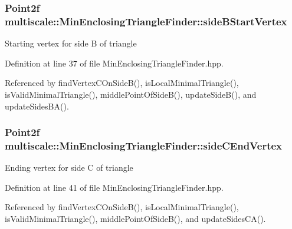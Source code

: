 \hypertarget{classmultiscale_1_1MinEnclosingTriangleFinder_a5f6c0f9361e4aab168f068f08b700742}{
\subsubsection[{side\-B\-Start\-Vertex}]{\setlength{\rightskip}{0pt plus 5cm}Point2f multiscale\-::\-Min\-Enclosing\-Triangle\-Finder\-::side\-B\-Start\-Vertex\hspace{0.3cm}{\ttfamily [private]}}}\label{classmultiscale_1_1MinEnclosingTriangleFinder_a5f6c0f9361e4aab168f068f08b700742}
Starting vertex for side B of triangle 

Definition at line 37 of file Min\-Enclosing\-Triangle\-Finder.\-hpp.



Referenced by find\-Vertex\-C\-On\-Side\-B(), is\-Local\-Minimal\-Triangle(), is\-Valid\-Minimal\-Triangle(), middle\-Point\-Of\-Side\-B(), update\-Side\-B(), and update\-Sides\-B\-A().

\hypertarget{classmultiscale_1_1MinEnclosingTriangleFinder_a3f0f5bbef4e89caed8d153f1fc2eccea}{
\subsubsection[{side\-C\-End\-Vertex}]{\setlength{\rightskip}{0pt plus 5cm}Point2f multiscale\-::\-Min\-Enclosing\-Triangle\-Finder\-::side\-C\-End\-Vertex\hspace{0.3cm}{\ttfamily [private]}}}\label{classmultiscale_1_1MinEnclosingTriangleFinder_a3f0f5bbef4e89caed8d153f1fc2eccea}
Ending vertex for side C of triangle 

Definition at line 41 of file Min\-Enclosing\-Triangle\-Finder.\-hpp.



Referenced by find\-Vertex\-C\-On\-Side\-B(), is\-Local\-Minimal\-Triangle(), is\-Valid\-Minimal\-Triangle(), middle\-Point\-Of\-Side\-B(), and update\-Sides\-C\-A().

